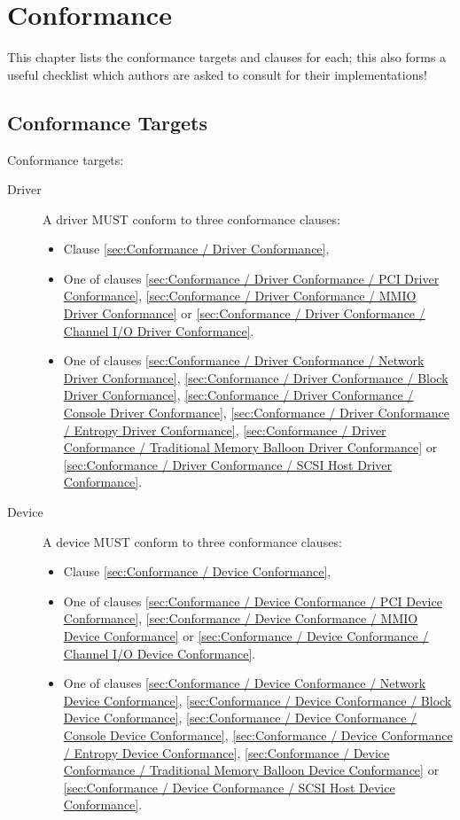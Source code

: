 \chapter{Conformance}

This chapter lists the conformance targets and clauses for each; this
also forms a useful checklist which authors are asked to consult for their
implementations!

\section{Conformance Targets}\label{sec:Conformance / Conformance Targets}

Conformance targets:
\begin{description}
\item[Driver] A driver MUST conform to three conformance clauses:
  \begin{itemize}
    \item Clause \ref{sec:Conformance / Driver Conformance},
    \item One of clauses \ref{sec:Conformance / Driver Conformance / PCI Driver Conformance}, \ref{sec:Conformance / Driver Conformance / MMIO Driver Conformance} or \ref{sec:Conformance / Driver Conformance / Channel I/O Driver Conformance}.
    \item One of clauses \ref{sec:Conformance / Driver Conformance / Network Driver Conformance}, \ref{sec:Conformance / Driver Conformance / Block Driver Conformance}, \ref{sec:Conformance / Driver Conformance / Console Driver Conformance}, \ref{sec:Conformance / Driver Conformance / Entropy Driver Conformance}, \ref{sec:Conformance / Driver Conformance / Traditional Memory Balloon Driver Conformance} or \ref{sec:Conformance / Driver Conformance / SCSI Host Driver Conformance}.
  \end{itemize}
\item[Device] A device MUST conform to three conformance clauses:
  \begin{itemize}
    \item Clause \ref{sec:Conformance / Device Conformance},
    \item One of clauses \ref{sec:Conformance / Device Conformance / PCI Device Conformance}, \ref{sec:Conformance / Device Conformance / MMIO Device Conformance} or \ref{sec:Conformance / Device Conformance / Channel I/O Device Conformance}.
    \item One of clauses \ref{sec:Conformance / Device Conformance / Network Device Conformance}, \ref{sec:Conformance / Device Conformance / Block Device Conformance}, \ref{sec:Conformance / Device Conformance / Console Device Conformance}, \ref{sec:Conformance / Device Conformance / Entropy Device Conformance}, \ref{sec:Conformance / Device Conformance / Traditional Memory Balloon Device Conformance} or \ref{sec:Conformance / Device Conformance / SCSI Host Device Conformance}.
  \end{itemize}
\end{description}

